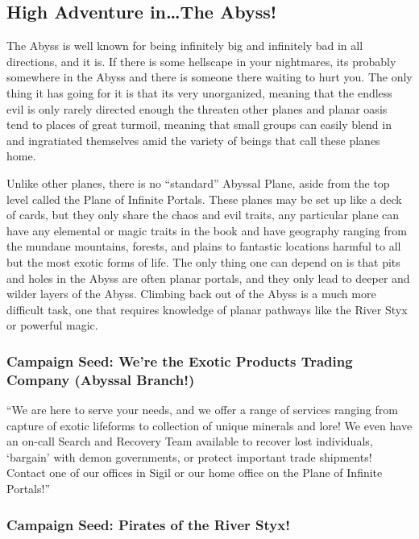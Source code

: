 \subsection{High Adventure in\ldots The Abyss!}

The Abyss is well known for being infinitely big and infinitely bad in all directions, and it is. If there is some hellscape in your nightmares, its probably somewhere in the Abyss and there is someone there waiting to hurt you. The only thing it has going for it is that its very unorganized, meaning that the endless evil is only rarely directed enough the threaten other planes and planar oasis tend to places of great turmoil, meaning that small groups can easily blend in and ingratiated themselves amid the variety of beings that call these planes home.

Unlike other planes, there is no ``standard'' Abyssal Plane, aside from the top level called the Plane of Infinite Portals. These planes may be set up like a deck of cards, but they only share the chaos and evil traits, any particular plane can have any elemental or magic traits in the book and have geography ranging from the mundane mountains, forests, and plains to fantastic locations harmful to all but the most exotic forms of life. The only thing one can depend on is that pits and holes in the Abyss are often planar portals, and they only lead to deeper and wilder layers of the Abyss. Climbing back out of the Abyss is a much more difficult task, one that requires knowledge of planar pathways like the River Styx or powerful magic.

\subsubsection{Campaign Seed: We're the Exotic Products Trading Company (Abyssal Branch!)}

``We are here to serve your needs, and we offer a range of services ranging from capture of exotic lifeforms to collection of unique minerals and lore! We even have an on-call Search and Recovery Team available to recover lost individuals, `bargain' with demon governments, or protect important trade shipments! Contact one of our offices in Sigil or our home office on the Plane of Infinite Portals!''

\subsubsection{Campaign Seed: Pirates of the River Styx!}

